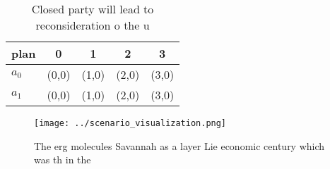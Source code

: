 \documentclass[a4paper]{article}
\begin{document}
\begin{table}
\begin{adjustbox}{width=0.7\columnwidth}
\begin{tabular}{|l|l|l|l|l|}
\hline
\textbf{plan} & \multicolumn{1}{c|}{\textbf{0}} & \multicolumn{1}{c|}{\textbf{1}} & \multicolumn{1}{c|}{\textbf{2}} & \multicolumn{1}{c|}{\textbf{3}} \\ \hline
\textbf{$a_0$}  & (0,0) & (1,0) & (2,0) & (3,0) \\ \hline
\textbf{$a_1$}  & (0,0) & (1,0) & (2,0) & (3,0) \\ \hline
\end{tabular}
\end{adjustbox}
\caption{Closed party will lead to reconsideration o the u
}
\end{table}

\begin{figure}
\centering
\texttt{[image: ../scenario\_visualization.png]}
\caption{The erg molecules Savannah as a layer Lie economic century which was th in the 
}
\end{figure}
 
\end{document}
